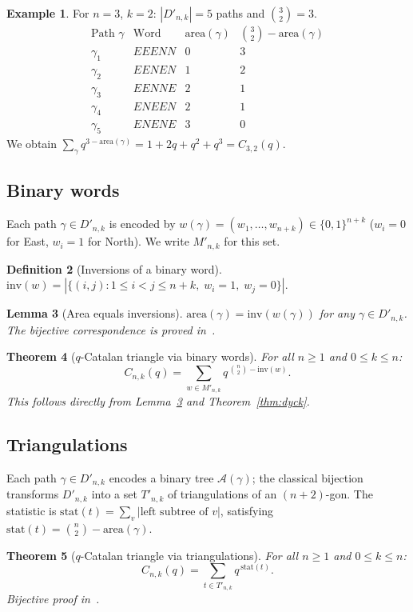\documentclass[12pt,a4paper,reqno]{amsart}
\theoremstyle{plain}
\newtheorem{theorem}{Theorem}[section]
\newtheorem{lemma}[theorem]{Lemma}
\theoremstyle{definition}
\newtheorem{definition}[theorem]{Definition}
\newtheorem{example}[theorem]{Example}
\newcommand{\Inv}{\mathrm{inv}}
\newcommand{\Area}{\mathrm{area}}
\newcommand{\Dnk}{D'_{n,k}}
\newcommand{\Mnk}{M'_{n,k}}
\begin{document}
\begin{example}\label{ex:D32}
For $n=3$, $k=2$: $|\Dnk|=5$ paths and $\binom{3}{2}=3$.
\[\begin{array}{c|c|c|c}
\text{Path }\gamma & \text{Word} & \Area(\gamma) & \binom{3}{2}-\Area(\gamma)\\\hline
\gamma_1 & EEENN & 0 & 3\\ \gamma_2 & EENEN & 1 & 2\\
\gamma_3 & EENNE & 2 & 1\\ \gamma_4 & ENEEN & 2 & 1\\ \gamma_5 & ENENE & 3 & 0
\end{array}\]
We obtain $\sum_{\gamma}q^{3-\Area(\gamma)}=1+2q+q^2+q^3=C_{3,2}(q)$.\checkmark
\end{example}

\subsection{Binary words}
Each path $\gamma\in\Dnk$ is encoded by
$w(\gamma)=(w_1,\ldots,w_{n+k})\in\{0,1\}^{n+k}$
($w_i=0$ for East, $w_i=1$ for North). We write $\Mnk$ for this set.
\begin{definition}[Inversions of a binary word]\label{def:invword}
$\Inv(w) = |\{(i,j):1\le i<j\le n+k,\;w_i=1,\;w_j=0\}|$.
\end{definition}
\begin{lemma}[Area equals inversions]\label{lem:area_inv}
$\Area(\gamma)=\Inv(w(\gamma))$ for any $\gamma\in\Dnk$.
The bijective correspondence is proved in~\cite{W4}.
\end{lemma}
\begin{theorem}[$q$-Catalan triangle via binary words]\label{thm:binary}
For all $n\ge1$ and $0\le k\le n$:
\begin{equation}\label{eq:binary_stat}
C_{n,k}(q) = \sum_{w\in\Mnk} q^{\,\binom{n}{2}-\Inv(w)}.
\end{equation}
This follows directly from Lemma~\ref{lem:area_inv} and Theorem~\ref{thm:dyck}.
\end{theorem}

\subsection{Triangulations}
Each path $\gamma\in\Dnk$ encodes a binary tree $\mathcal{A}(\gamma)$;
the classical bijection~\cite{Stanley2} transforms $\Dnk$ into
a set $T'_{n,k}$ of triangulations of an $(n+2)$-gon.
The statistic is $\mathrm{stat}(t)=\sum_{v}|\text{left subtree of }v|$,
satisfying $\mathrm{stat}(t)=\binom{n}{2}-\Area(\gamma)$.
\begin{theorem}[$q$-Catalan triangle via triangulations]\label{thm:triang}
For all $n\ge1$ and $0\le k\le n$:
\begin{equation}\label{eq:triang}
C_{n,k}(q) = \sum_{t\in T'_{n,k}} q^{\,\mathrm{stat}(t)}.
\end{equation}
Bijective proof in~\cite{W4}.
\end{theorem}
\end{document}
